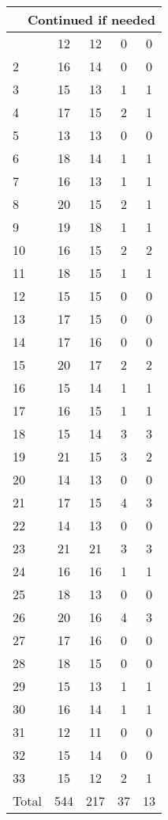\begin{center}
\begin{longtable}{l|c|c|c|c}
\hline \multicolumn{5}{|r|}{{Continued if needed}} \\ \hline
\endfoot 
1 & 12 & 12 & 0 & 0\\ \hline
2 & 16 & 14 & 0 & 0\\ \hline
3 & 15 & 13 & 1 & 1\\ \hline
4 & 17 & 15 & 2 & 1\\ \hline
5 & 13 & 13 & 0 & 0\\ \hline
6 & 18 & 14 & 1 & 1\\ \hline
7 & 16 & 13 & 1 & 1\\ \hline
8 & 20 & 15 & 2 & 1\\ \hline
9 & 19 & 18 & 1 & 1\\ \hline
10 & 16 & 15 & 2 & 2\\ \hline
11 & 18 & 15 & 1 & 1\\ \hline
12 & 15 & 15 & 0 & 0\\ \hline
13 & 17 & 15 & 0 & 0\\ \hline
14 & 17 & 16 & 0 & 0\\ \hline
15 & 20 & 17 & 2 & 2\\ \hline
16 & 15 & 14 & 1 & 1\\ \hline
17 & 16 & 15 & 1 & 1\\ \hline
18 & 15 & 14 & 3 & 3\\ \hline
19 & 21 & 15 & 3 & 2\\ \hline
20 & 14 & 13 & 0 & 0\\ \hline
21 & 17 & 15 & 4 & 3\\ \hline
22 & 14 & 13 & 0 & 0\\ \hline
23 & 21 & 21 & 3 & 3\\ \hline
24 & 16 & 16 & 1 & 1\\ \hline
25 & 18 & 13 & 0 & 0\\ \hline
26 & 20 & 16 & 4 & 3\\ \hline
27 & 17 & 16 & 0 & 0\\ \hline
28 & 18 & 15 & 0 & 0\\ \hline
29 & 15 & 13 & 1 & 1\\ \hline
30 & 16 & 14 & 1 & 1\\ \hline
31 & 12 & 11 & 0 & 0\\ \hline
32 & 15 & 14 & 0 & 0\\ \hline
33 & 15 & 12 & 2 & 1\\ \hline
\hline \hline
Total & 544 & 217 & 37 & 13




\end{longtable}
\end{center}

